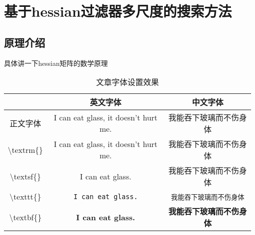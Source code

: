 \chapter{基于hessian过滤器多尺度的搜索方法}
\section{原理介绍}
具体讲一下hessian矩阵的数学原理
\begin{table}[htb]
	\caption{文章字体设置效果}
	\label{tab:文章字体设置效果}
	\begin{center}
		\begin{tabular}{ccc}
			\toprule
					& 英文字体 & 中文字体  \\
			\midrule
			正文字体 & I can eat glass, it doesn't hurt me. & 我能吞下玻璃而不伤身体 \\
			\textbackslash textrm\{\} & \textrm{I can eat glass, it doesn't hurt me.} & \textrm{我能吞下玻璃而不伤身体} \\
			\textbackslash textsf\{\} & \textsf{I can eat glass.} & \textsf{我能吞下玻璃而不伤身体} \\
			\textbackslash texttt\{\} & \texttt{I can eat glass.} & \texttt{我能吞下玻璃而不伤身体} \\
			\textbackslash textbf\{\} & \textbf{I can eat glass.} & \textbf{我能吞下玻璃而不伤身体} \\
			\bottomrule
		\end{tabular}
	\end{center}
\end{table}

